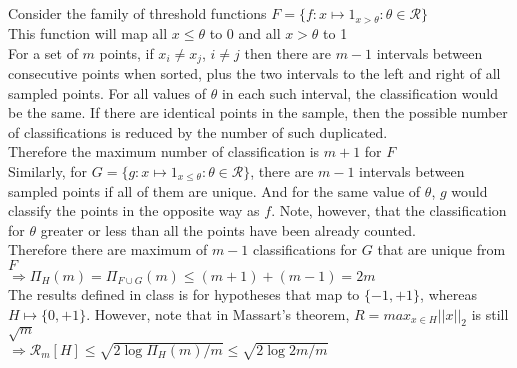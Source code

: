 \documentclass[11pt, oneside]{article}   	%
\begin{document}
\subsection{}
Consider the family of threshold functions $F=\{f:x\mapsto1_{x>\theta}:\theta\in\mathcal{R}\}$\\
\indent This function will map all $x\leq\theta$ to 0 and all $x>\theta$ to 1\\
\indent For a set of $m$ points, if $x_i\neq x_j$, $i\neq j$ then there are $m-1$ intervals between consecutive points when sorted, plus the two intervals to the left and right of all sampled points. For all values of $\theta$ in each such interval, the classification would be the same. If there are identical points in the sample, then the possible number of classifications is reduced by the number of such duplicated. \\
\indent Therefore the maximum number of classification is $m+1$ for $F$\\
\indent Similarly, for $G=\{g:x\mapsto 1_{x\leq \theta} : \theta\in\mathcal{R}\}$, there are $m-1$ intervals between sampled points if all of them are unique. And for the same value of $\theta$, $g$ would classify the points in the opposite way as $f$. Note, however, that the classification for $\theta$ greater or less than all the points have been already counted.\\
\indent Therefore there are maximum of $m-1$ classifications for $G$ that are unique from $F$\\
\indent $\Rightarrow \Pi_H(m)=\Pi_{F\cup G}(m)\leq (m+1) + (m-1) = 2m$\\
\indent The results defined in class is for hypotheses that map to $\{-1,+1\}$, whereas $H\mapsto\{0,+1\}$. However, note that in Massart's theorem, $R=max_{x\in H} ||x||_2$ is still $\sqrt{m}$\\
\indent $\Rightarrow \mathcal{R}_m[H]\leq \sqrt{{2\log\Pi_H(m)}/m}\leq \sqrt{{2\log{2m}}/m}$\\
\subsection{}
\end{document}
